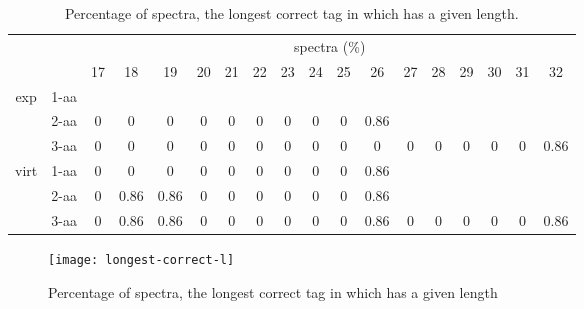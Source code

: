 \documentclass{article}[12pt]
\begin{document}
\begin{landscape}
\begin{table}[h]\tiny
\vspace{3mm}
{\centering
\begin{center}
\begin{tabular}{|c|l|c|c|c|c|c|c|c|c|c|c|c|c|c|c|c|c|}
  \hline
  \multicolumn{2}{|c|}{ } & \multicolumn{ 16 }{|c|}{ spectra (\%)} \\
  \cline{3- 18}
  \multicolumn{2}{|c|}{ }  & 17 & 18 & 19 & 20 & 21 & 22 & 23 & 24 & 25 & 26 & 27 & 28 & 29 & 30 & 31 & 32\\
  \hline
  \multirow{3}{*}{exp}
&  1-aa  &  &  &  &  &  &  &  &  &  &  &  &  &  &  &  & \\
&  2-aa  & 0 & 0 & 0 & 0 & 0 & 0 & 0 & 0 & 0 & 0.86 &  &  &  &  &  & \\
&  3-aa  & 0 & 0 & 0 & 0 & 0 & 0 & 0 & 0 & 0 & 0 & 0 & 0 & 0 & 0 & 0 & 0.86\\
 \hline
  \multirow{3}{*}{virt} 
&  1-aa  & 0 & 0 & 0 & 0 & 0 & 0 & 0 & 0 & 0 & 0.86 &  &  &  &  &  & \\
&  2-aa  & 0 & 0.86 & 0.86 & 0 & 0 & 0 & 0 & 0 & 0 & 0.86 &  &  &  &  &  & \\
&  3-aa  & 0 & 0.86 & 0.86 & 0 & 0 & 0 & 0 & 0 & 0 & 0.86 & 0 & 0 & 0 & 0 & 0 & 0.86\\
 \hline
\end{tabular}
\end{center}
\par}
\centering
\caption{ Percentage of spectra, the longest correct tag in which has a given length.}
\label{table:longest-correct-l}
\vspace{3mm}
\end{table}

\end{landscape}

\begin{figure}
  \begin{center}
\texttt{[image: longest-correct-l]}
\end{center}
\caption{Percentage of spectra, the longest correct tag in which has a given length}
  \label{fig:longest-correct-l}
\end{figure}
\end{document}
